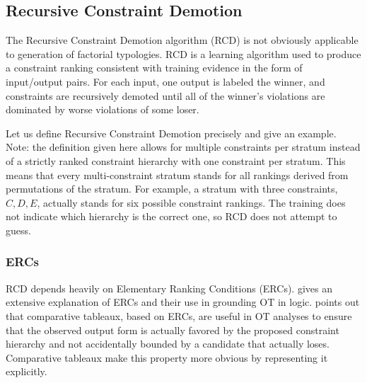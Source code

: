 \documentclass[11pt]{article}
\begin{document}
  \subsection{Recursive Constraint Demotion}
\label{rcd}

  The Recursive Constraint Demotion algorithm (RCD) is not obviously
applicable to generation of factorial typologies. RCD is a learning
algorithm used to produce a constraint ranking consistent
with training evidence in the form of input/output pairs. For each
input, one output is labeled the winner, and constraints are
recursively demoted until all of the winner's violations are dominated by
worse violations of some loser.


Let us define Recursive Constraint Demotion precisely and give an
example.  Note: the definition given here allows for multiple
constraints per stratum instead of a strictly ranked constraint
hierarchy with one constraint per stratum. This means that every
multi-constraint stratum stands for all rankings derived from
permutations of the stratum. For example, a stratum with three
constraints, $C, D, E$, actually stands for six possible constraint
rankings. The training does not indicate which hierarchy is the
correct one, so RCD does not attempt to guess.

\subsubsection{ERCs}
RCD depends heavily on Elementary Ranking Conditions
(ERCs).  gives an extensive explanation of ERCs and
their use in grounding OT in logic.  points out
that comparative tableaux, based on ERCs, are useful in OT analyses to
ensure that the observed output form is actually favored by the
proposed constraint hierarchy and not accidentally bounded by a
candidate that actually loses. Comparative tableaux make this property
more obvious by representing it explicitly.
\end{document}
